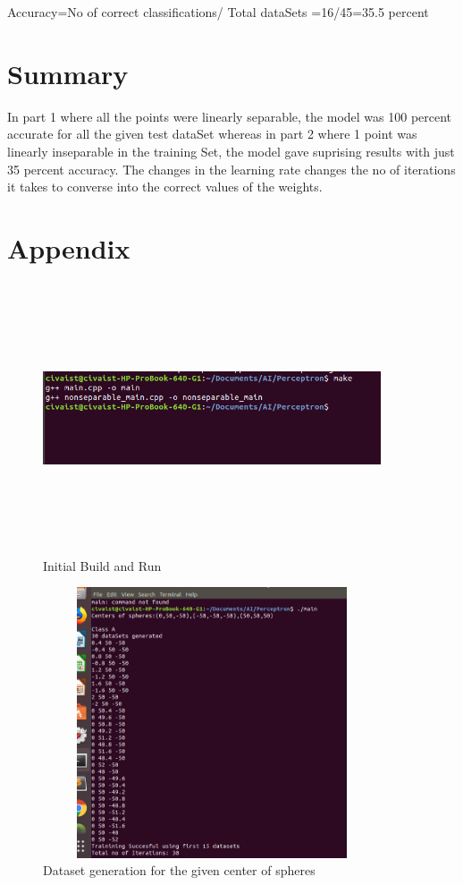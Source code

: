 \documentclass[letterpaper]{article}
\begin{document}
Accuracy=No of correct classifications/ Total dataSets =16/45=35.5 percent 

\section {Summary}
  In part 1 where all the points were linearly separable, the model was 100 percent accurate for all the given test dataSet whereas in part 2 where 1 point was linearly inseparable in the training Set, the model gave suprising results with just 35 percent accuracy. The changes in the learning rate changes the no of iterations it takes to converse into the correct values of the weights. 
  
\section {Appendix}

\begin{figure}[h]
\caption{Initial Build and Run}
\centering
\includegraphics[width=10cm,height=8cm]{make}
\end{figure}

\begin{figure}[h]
\caption{Dataset generation for the given center of spheres}
\centering
\includegraphics[width=10cm,height=8cm]{Dataset_generation}
\end{figure}
\end{document}
